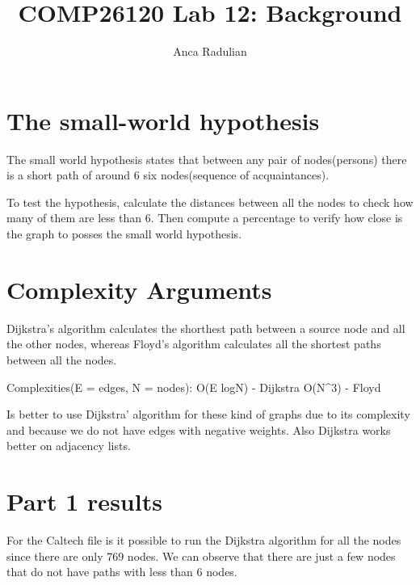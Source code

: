 \documentclass{article}
\title{COMP26120 Lab 12: Background}
\author{Anca Radulian}
\begin{document}
\maketitle


\section{The small-world hypothesis}
\label{sec:small world}

The small world hypothesis states that between any pair of nodes(persons) there
is a short path of around 6 six nodes(sequence of acquaintances).

To test the hypothesis, calculate the distances between all the nodes to check
how many of them are less than 6. Then compute a percentage to verify how close
is the graph to posses the small world hypothesis.

\section{Complexity Arguments}
\label{sec:complexity}

Dijkstra's algorithm calculates the shorthest path between a source node and all
the other nodes, whereas Floyd's algorithm calculates all the shortest paths
between all the nodes.

Complexities(E = edges, N = nodes):
    O(E logN) - Dijkstra
    O(N^3)    - Floyd

Is better to use Dijkstra' algorithm for these kind of graphs due to its
complexity and because we do not have edges with negative weights. Also Dijkstra
works better on adjacency lists.

\section{Part 1 results}
\label{sec:part1}

For the Caltech file is it possible to run the Dijkstra algorithm for all the
nodes since there are only 769 nodes. We can observe that there are just a few
nodes that do not have paths with less than 6 nodes.
\end{document}
